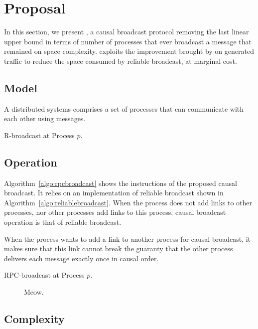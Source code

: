 
\section{Proposal}
\label{sec:proposal}

In this section, we present \RPCBROADCAST, a causal broadcast protocol removing
the last linear upper bound in terms of number of processes that ever broadcast
a message that remained on space complexity. \RPCBROADCAST exploits the
improvement brought by \PCBROADCAST on generated traffic to reduce the space
consumed by reliable broadcast, at marginal cost.

\subsection{Model}

A distributed systems comprises a set of processes that can communicate with
each other using messages.


\begin{algorithm}[h]
  
  \caption{\label{algo:reliablebroadcast}R-broadcast at Process $p$.}
\end{algorithm}

\subsection{Operation}

Algorithm~\ref{algo:rpcbroadcast} shows the instructions of the proposed causal
broadcast. It relies on an implementation of reliable broadcast shown in
Algorithm~\ref{algo:reliablebroadcast}. When the process does not add links to
other processes, nor other processes add links to this process, causal broadcast
operation is that of reliable broadcast.

When the process wants to add a link to another process for causal broadcast, it
makes sure that this link cannot break the guaranty that the other process
delivers each message exactly once in causal order.


\begin{algorithm}[h]
  
  \caption{\label{algo:rpcbroadcast}RPC-broadcast at Process $p$.}
\end{algorithm}


\begin{figure*}
  \begin{center}
    
    \caption{Meow.}
  \end{center}
\end{figure*}

\subsection{Complexity}


